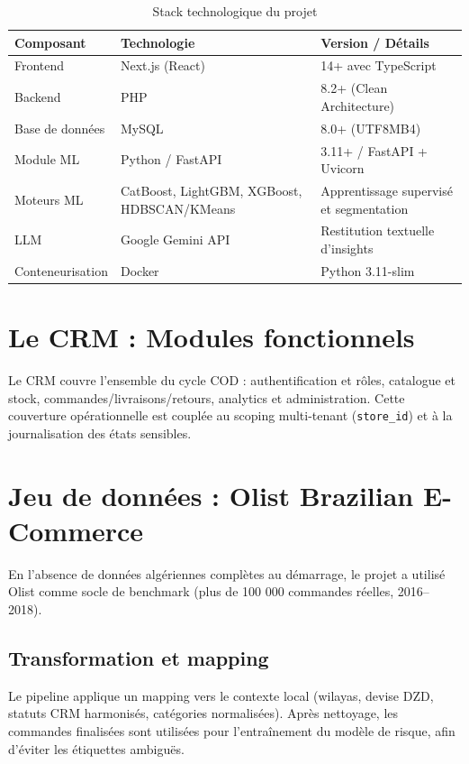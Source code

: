 \documentclass[12pt,a4paper]{report}
\begin{document}
\begin{table}[H]
\centering
\caption{Stack technologique du projet}
\label{tab:stack}
\begin{tabularx}{\textwidth}{l l X}
\toprule
\textbf{Composant} & \textbf{Technologie} & \textbf{Version / D\'{e}tails} \\
\midrule
Frontend & Next.js (React) & 14+ avec TypeScript \\
Backend & PHP & 8.2+ (Clean Architecture) \\
Base de donn\'{e}es & MySQL & 8.0+ (UTF8MB4) \\
Module ML & Python / FastAPI & 3.11+ / FastAPI + Uvicorn \\
Moteurs ML & CatBoost, LightGBM, XGBoost, HDBSCAN/KMeans & Apprentissage supervis\'{e} et segmentation \\
LLM & Google Gemini API & Restitution textuelle d'insights \\
Conteneurisation & Docker & Python 3.11-slim \\
\bottomrule
\end{tabularx}
\end{table}

\section{Le CRM : Modules fonctionnels}

Le CRM couvre l'ensemble du cycle COD : authentification et r\^{o}les, catalogue et stock, commandes/livraisons/retours, analytics et administration. Cette couverture op\'{e}rationnelle est coupl\'{e}e au scoping multi-tenant (\texttt{store\_id}) et \`{a} la journalisation des \'{e}tats sensibles.

\section{Jeu de donn\'{e}es : Olist Brazilian E-Commerce}

En l'absence de donn\'{e}es alg\'{e}riennes compl\`{e}tes au d\'{e}marrage, le projet a utilis\'{e} Olist \cite{olist2018} comme socle de benchmark (plus de 100 000 commandes r\'{e}elles, 2016--2018).

\subsection{Transformation et mapping}

Le pipeline applique un mapping vers le contexte local (wilayas, devise DZD, statuts CRM harmonis\'{e}s, cat\'{e}gories normalis\'{e}es). Apr\`{e}s nettoyage, les commandes finalis\'{e}es sont utilis\'{e}es pour l'entra\^{i}nement du mod\`{e}le de risque, afin d'\'{e}viter les \'{e}tiquettes ambigu\"{e}s.
\end{document}

